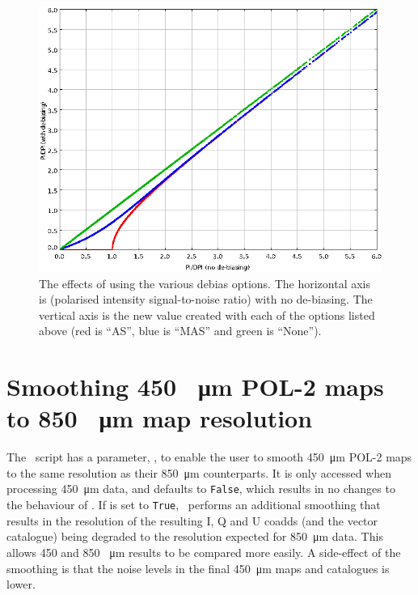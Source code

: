 \begin{figure}[ht!]
\begin{center}
\includegraphics[width=0.8\linewidth]{sc22-poledit-debias.png}
\caption [The effects of using the various  debias options]{
  The effects of using the various  debias options. The horizontal axis is  (polarised intensity signal-to-noise ratio) with no de-biasing. The vertical axis is the new  value created with each of the  options listed above (red is ``AS'', blue is ``MAS'' and green is ``None'').
\label{fig:poleditdebias-1}
}
\end{center}
\end{figure}


\section{Smoothing 450 \SI{}{\micro\metre} POL-2 maps to 850 \SI{}{\micro\metre} map resolution}

The \poltwomap\ script has a parameter, , to enable the user to smooth
\SI{450}{\micro\metre} POL-2 maps to the same resolution as their \SI{850}{\micro\metre} counterparts. It is only accessed when processing \SI{450}{\micro\metre} data, and defaults to \texttt{False}, which results in no changes to the behaviour of \poltwomap. If  is set to \texttt{True}, \poltwomap\ performs an additional smoothing that results in the resolution of the resulting I, Q and U coadds (and the vector catalogue) being degraded to the resolution expected for \SI{850}{\micro\metre} data. This allows 450 and 850 \SI{}{\micro\metre} results to be compared more easily. A side-effect of the smoothing is that the noise levels in the final \SI{450}{\micro\metre} maps and catalogues is lower.

